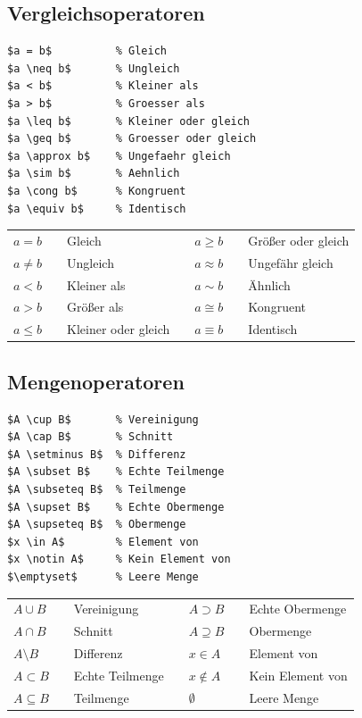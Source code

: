 \documentclass[12pt,a4paper]{article}
\begin{document}
\subsection{Vergleichsoperatoren}

\begin{lstlisting}[style=latex]
$a = b$          % Gleich
$a \neq b$       % Ungleich
$a < b$          % Kleiner als
$a > b$          % Groesser als
$a \leq b$       % Kleiner oder gleich
$a \geq b$       % Groesser oder gleich
$a \approx b$    % Ungefaehr gleich
$a \sim b$       % Aehnlich
$a \cong b$      % Kongruent
$a \equiv b$     % Identisch
\end{lstlisting}

\begin{ausgabe}
\begin{tabular}{l c l c l c l}
	$a = b$ & & Gleich & \hspace{2cm} & $a \geq b$ & & Größer oder gleich\\
	$a \neq b$ & & Ungleich & & $a \approx b$ & & Ungefähr gleich\\
	$a < b$ & & Kleiner als & & $a \sim b$ & & Ähnlich\\
	$a > b$ & & Größer als & & $a \cong b$ & & Kongruent\\
	$a \leq b$ & & Kleiner oder gleich & & $a \equiv b$ & & Identisch
\end{tabular}
\end{ausgabe}



\subsection{Mengenoperatoren}

\begin{lstlisting}[style=latex]
$A \cup B$       % Vereinigung
$A \cap B$       % Schnitt
$A \setminus B$  % Differenz
$A \subset B$    % Echte Teilmenge
$A \subseteq B$  % Teilmenge
$A \supset B$    % Echte Obermenge
$A \supseteq B$  % Obermenge
$x \in A$        % Element von
$x \notin A$     % Kein Element von
$\emptyset$      % Leere Menge
\end{lstlisting}

\begin{ausgabe}
\begin{tabular}{l c l c l c l}
	$A \cup B$ & & Vereinigung & \hspace{2cm} & $A \supset B$ & & Echte Obermenge\\
	$A \cap B$ & &  Schnitt & & $A \supseteq B$ & & Obermenge\\
	$A \setminus B$ & & Differenz & & $x \in A$ & & Element von\\
	$A \subset B$ & & Echte Teilmenge & & $x \notin A$ & & Kein Element von\\
	$A \subseteq B$ & & Teilmenge & & $\emptyset$ & & Leere Menge
\end{tabular}
\end{ausgabe}
\end{document}

